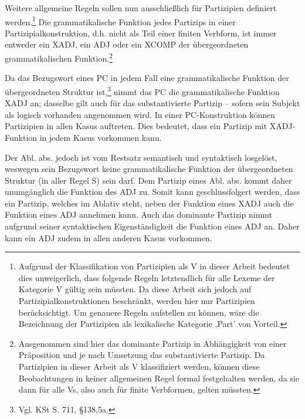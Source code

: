 \documentclass[12pt,a4paper]{article}
\begin{document}

Weitere allgemeine Regeln sollen nun ausschließlich für Partizipien definiert werden.\footnote{Aufgrund der Klassifikation von Partizipien als V in dieser Arbeit bedeutet dies unweigerlich, dass folgende Regeln letztendlich für alle Lexeme der Kategorie V gültig sein müssten. Da diese Arbeit sich jedoch auf Partizipialkonstruktionen beschränkt, werden hier nur Partizipien berücksichtigt. Um genauere Regeln aufstellen zu können, wäre die Bezeichnung der Partizipien als lexikalische Kategorie ,Part' von Vorteil.}
Die grammatikalische Funktion jedes Partizips in einer Partizipialkonstruktion, d.h. nicht als Teil einer finiten Verbform, ist immer entweder ein XADJ, ein ADJ oder ein XCOMP der übergeordneten grammatikalischen Funktion.\footnote{Ausgenommen sind hier das dominante Partizip in Abhängigkeit von einer Präposition und je nach Umsetzung das substantivierte Partizip. Da Partizipien in dieser Arbeit als V klassifiziert werden, können diese Beobachtungen in keiner allgemeinen Regel formal festgehalten werden, da sie dann für alle Vs, also auch für finite Verbformen, gelten müssten.}

Da das Bezugswort eines PC in jedem Fall eine grammatikalische Funktion der übergeordneten Struktur ist,\footnote{Vgl. KSt S. 711, §138,5a.} nimmt das PC die grammatikalische Funktion XADJ an; dasselbe gilt auch für das substantivierte Partizip -- sofern sein Subjekt als logisch vorhanden angenommen wird. In einer PC-Konstruktion können Partizipien in allen Kasus auftreten. Dies bedeutet, dass ein Partizip mit XADJ-Funktion in jedem Kasus vorkommen kann.

Der Abl. abs. jedoch ist vom Restsatz semantisch und syntaktisch losgelöst, weswegen sein Bezugswort keine grammatikalische Funktion der übergeordneten Struktur (in aller Regel S) sein darf. Dem Partizip eines Abl. abs. kommt daher unumgänglich die Funktion des ADJ zu. Somit kann geschlussfolgert werden, dass ein Partizip, welches im Ablativ steht, neben der Funktion eines XADJ auch die Funktion eines ADJ annehmen kann. Auch das dominante Partizip nimmt aufgrund seiner syntaktischen Eigenständigkeit die Funktion eines ADJ an. Daher kann ein ADJ zudem in allen anderen Kasus vorkommen.
\end{document}
